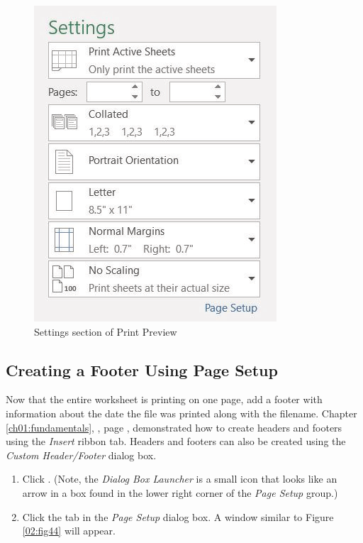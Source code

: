\begin{figure}[H]
	\centering
	\includegraphics[width=\maxwidth{.95\linewidth}]{gfx/ch02_fig43}
	\caption{Settings section of Print Preview}
	\label{02:fig43}
\end{figure}

\subsection{Creating a Footer Using Page Setup}

Now that the entire worksheet is printing on one page, add a footer with information about the date the file was printed along with the filename. Chapter \ref{ch01:fundamentals}, , page \pageref{ch01:fundamentals}, demonstrated how to create headers and footers using the \textit{Insert} ribbon tab. Headers and footers can also be created using the \textit{Custom Header/Footer} dialog box.

\begin{enumerate}
	\item Click . (Note, the \textit{Dialog Box Launcher} is a small icon that looks like an arrow in a box found in the lower right corner of the \textit{Page Setup} group.)
	\item Click the  tab in the \textit{Page Setup} dialog box. A window similar to Figure \ref{02:fig44} will appear.
\end{enumerate}


